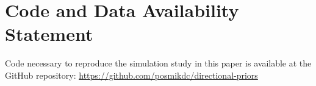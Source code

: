 \documentclass[twoside,11pt]{article}
\begin{document}
\section{Code and Data Availability Statement}

Code necessary to reproduce the simulation study in this paper is available at the GitHub repository: \href{https://github.com/posmikdc/directional-priors}{https://github.com/posmikdc/directional-priors}

\newpage


\end{document}
